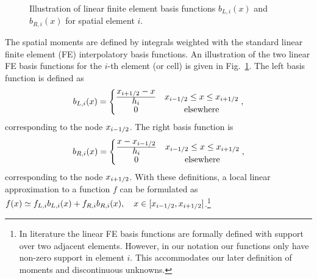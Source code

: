 \begin{figure}[H]
    \centering
    \begin{centering}
    \end{centering}
    \caption{Illustration of linear finite element basis functions $b_{L,i}(x)$ and
    $b_{R,i}(x)$ for spatial element $i$.\label{fig:lin_fe}}
\end{figure}

The spatial moments are defined by integrals weighted with the standard linear finite element (FE)
interpolatory basis functions.  An illustration of the two linear FE basis functions for
the $i$-th element (or cell) is
given in Fig.~\ref{fig:lin_fe}.  The left basis function is defined as
\begin{equation}
    b_{L,i}(x)= \left\{\begin{matrix} \frac{\displaystyle x_{{i+1/2}} - x}{\displaystyle h_i} & x_{{i-1/2}} \leq x \leq x_{{i+1/2}}
        \\ 0 &  \text{elsewhere}
    \end{matrix}\right.,
\end{equation}
corresponding to the node $x_{{i-1/2}}$.
The right basis function is 
\begin{equation}
    b_{R,i}(x)= \left\{\begin{matrix} \frac{\displaystyle x - x_{{i-1/2}}}{\displaystyle h_i} & x_{{i-1/2}} \leq x \leq x_{{i+1/2}}
        \\ 0 & \text{elsewhere}
    \end{matrix}\right. ,
\end{equation}
corresponding to the node $x_{{i+1/2}}$. With these definitions, a local linear approximation to a
function $f$ can be formulated as $f(x)\simeq f_{L,i} b_{L,i}(x) + f_{R,i}
b_{R,i}(x),\quad x\in[x_{{i-1/2}},x_{{i+1/2}}]$.\footnote{In literature the linear FE basis functions are
formally defined with support over two adjacent elements.  However, in our notation our 
functions only have non-zero support in element $i$. This accommodates our later
definition of moments and discontinuous unknowns.}

